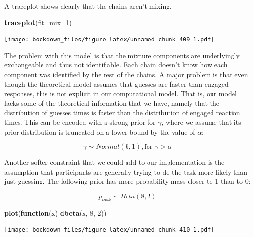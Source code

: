 \documentclass[12pt,]{krantz}
\newenvironment{Shaded}{\begin{snugshade}}{\end{snugshade}}
\newcommand{\KeywordTok}[1]{\textcolor[rgb]{0.13,0.29,0.53}{\textbf{#1}}}
\newcommand{\DecValTok}[1]{\textcolor[rgb]{0.00,0.00,0.81}{#1}}
\newcommand{\ControlFlowTok}[1]{\textcolor[rgb]{0.13,0.29,0.53}{\textbf{#1}}}
\newcommand{\NormalTok}[1]{#1}
\theoremstyle{definition}
\theoremstyle{definition}
\theoremstyle{definition}
\theoremstyle{remark}
\begin{document}
A traceplot shows clearly that the chains aren't mixing.

\begin{Shaded}
\begin{Highlighting}[]
\KeywordTok{traceplot}\NormalTok{(fit_mix_}\DecValTok{1}\NormalTok{) }
\end{Highlighting}
\end{Shaded}

\texttt{[image: bookdown\_files/figure-latex/unnamed-chunk-409-1.pdf]}

The problem with this model is that the mixture components are
underlyingly exchangeable and thus not identifiable. Each chain doesn't
know how each component was identified by the rest of the chains. A
major problem is that even though the theoretical model assumes that
guesses are faster than engaged responses, this is not explicit in our
computational model. That is, our model lacks some of the theoretical
information that we have, namely that the distribution of guesses times
is faster than the distribution of engaged reaction times. This can be
encoded with a strong prior for \(\gamma\), where we assume that its
prior distribution is truncated on a lower bound by the value of
\(\alpha\):

\begin{equation}
\gamma \sim Normal(6, 1), \text{for } \gamma > \alpha
\end{equation}

Another softer constraint that we could add to our implementation is the
assumption that participants are generally trying to do the task more
likely than just guessing. The following prior has more probability mass
closer to 1 than to 0:

\begin{equation}
p_{task} \sim Beta(8, 2)
\end{equation}

\begin{Shaded}
\begin{Highlighting}[]
\KeywordTok{plot}\NormalTok{(}\ControlFlowTok{function}\NormalTok{(x) }\KeywordTok{dbeta}\NormalTok{(x, }\DecValTok{8}\NormalTok{, }\DecValTok{2}\NormalTok{))}
\end{Highlighting}
\end{Shaded}

\texttt{[image: bookdown\_files/figure-latex/unnamed-chunk-410-1.pdf]}
\end{document}
